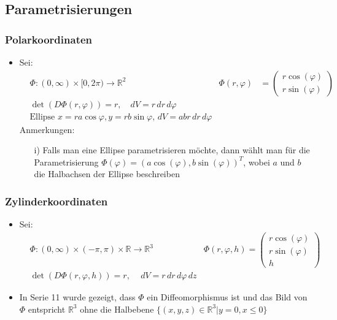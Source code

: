 \documentclass[a3paper, 11pt, landscape]{scrartcl}
\begin{document}
\begin{multicols*}{3}
	
	\subsection{Parametrisierungen}	
	\label{sec:param}
	\subsubsection{Polarkoordinaten}
		\begin{itemize}
		    \item Sei:
		\begin{align*}
			&\Phi: (0, \infty)\times [0, 2\pi) \rightarrow \mathbb{R}^2 & \Phi(r, \varphi)&=
			\begin{pmatrix}
				r\cos(\varphi)\\ r\sin(\varphi)
			\end{pmatrix}\\
			&\det (D\Phi (r, \varphi))=r,\quad dV = r\,dr\,d\varphi\\
			& \text{Ellipse } x=ra \cos{\varphi}, y= rb \sin{\varphi}, \,dV = abr\,dr\,d\varphi
		\end{align*}
	    Anmerkungen:
		\begin{itemize}
			\item[i)] Falls man eine Ellipse parametrisieren möchte, dann wählt man für die Parametrisierung $\Phi(\varphi) = (a\cos(\varphi), b\sin(\varphi))^T$, wobei $a$ und $b$ die Halbachsen der Ellipse beschreiben
		\end{itemize}
		\end{itemize}
	\subsubsection{Zylinderkoordinaten}
		\begin{itemize}
		    \item Sei:
		\begin{align*}
			&\Phi: (0, \infty)\times (-\pi, \pi)\times \mathbb{R} \rightarrow \mathbb{R}^3 & \Phi(r, \varphi, h)=
			\begin{pmatrix}
				r\cos(\varphi)\\ r\sin(\varphi)\\ h
			\end{pmatrix}\\
			&\det (D\Phi (r, \varphi, h))=r, \quad \,dV=r\,dr\,d\varphi\,dz
		\end{align*}
		\item In Serie 11 wurde gezeigt, dass $\Phi$ ein Diffeomorphismus ist und das Bild von $\Phi$ entspricht $\mathbb{R}^3$ ohne die Halbebene $\{(x,y,z)\in\mathbb{R}^3 | y=0,x\leq 0\}$
		\end{itemize}

\end{multicols*}
\end{document}
